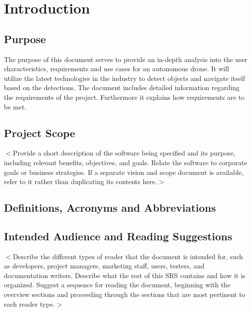 \chapter{Introduction}

\section{Purpose}
The purpose of this document serves to provide an in-depth analysis into the user characteristics, requirements and use cases for an autonomous drone. 
It will utilize the latest technologies in the industry to detect objects and navigate itself based on the detections. 
The document includes detailed information regarding the requirements of the project.
Furthermore it explains how requirements are to be met.

\section{Project Scope}
$<$Provide a short description of the software being specified and its purpose,
including relevant benefits, objectives, and goals. Relate the software to
corporate goals or business strategies. If a separate vision and scope document
is available, refer to it rather than duplicating its contents here.$>$

\section{Definitions, Acronyms and Abbreviations}


\section{Intended Audience and Reading Suggestions}
$<$Describe the different types of reader that the document is intended for,
such as developers, project managers, marketing staff, users, testers, and
documentation writers. Describe what the rest of this SRS contains and how it is
organized. Suggest a sequence for reading the document, beginning with the
overview sections and proceeding through the sections that are most pertinent to
each reader type.$>$



